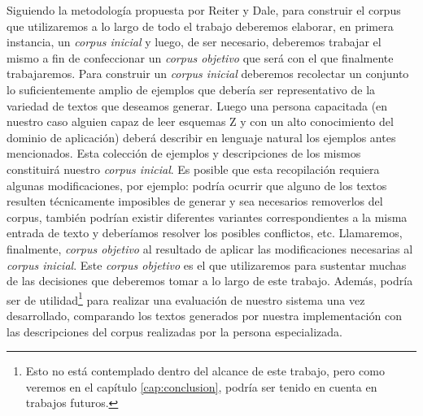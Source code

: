 Siguiendo la metodología propuesta por Reiter y Dale, para construir el corpus que utilizaremos a lo largo de todo el trabajo deberemos elaborar, en primera instancia, un \emph{corpus inicial} y luego, de ser necesario, deberemos trabajar el mismo a fin de confeccionar un \emph{corpus objetivo} que será con el que finalmente trabajaremos. Para construir un \emph{corpus inicial} deberemos recolectar un conjunto lo suficientemente amplio de ejemplos que debería ser representativo de la variedad de textos que deseamos generar. Luego una persona capacitada (en nuestro caso alguien capaz de leer esquemas Z y con un alto conocimiento del dominio de aplicación) deberá describir en lenguaje natural los ejemplos antes mencionados. Esta colección de ejemplos y descripciones de los mismos constituirá nuestro \emph{corpus inicial}. Es posible que esta recopilación requiera algunas modificaciones, por ejemplo: podría ocurrir que alguno de los textos resulten técnicamente imposibles de generar y sea necesarios removerlos del corpus, también podrían existir diferentes variantes correspondientes a la misma entrada de texto y deberíamos resolver los posibles conflictos, etc. Llamaremos, finalmente, \emph{corpus objetivo} al resultado de aplicar las modificaciones necesarias al \emph{corpus inicial}. Este \emph{corpus objetivo} es el que utilizaremos para sustentar muchas de las decisiones que deberemos tomar a lo largo de este trabajo. Además, podría ser de utilidad\footnote{Esto no está contemplado dentro del alcance de este trabajo, pero como veremos en el capítulo \ref{cap:conclusion}, podría ser tenido en cuenta en trabajos futuros.} para realizar una evaluación de nuestro sistema una vez desarrollado, comparando los textos generados por nuestra implementación con las descripciones del corpus realizadas por la persona especializada.

